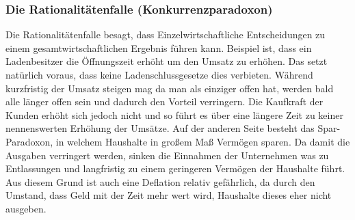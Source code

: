 \documentclass{article}
\begin{document}
	\subsubsection{Die Rationalitätenfalle (Konkurrenzparadoxon)}
	Die Rationalitätenfalle besagt, dass Einzelwirtschaftliche Entscheidungen zu einem gesamtwirtschaftlichen Ergebnis führen kann. Beispiel ist, dass ein Ladenbesitzer die Öffnungszeit erhöht um den Umsatz zu erhöhen. Das setzt natürlich voraus, dass keine Ladenschlussgesetze dies verbieten. Während kurzfristig der Umsatz steigen mag da man als einziger offen hat, werden bald alle länger offen sein und dadurch den Vorteil verringern. Die Kaufkraft der Kunden erhöht sich jedoch nicht und so führt es über eine längere Zeit zu keiner nennenswerten Erhöhung der Umsätze. 
	Auf der anderen Seite besteht das Spar-Paradoxon, in welchem Haushalte in großem Maß Vermögen sparen. Da damit die Ausgaben verringert werden, sinken die Einnahmen der Unternehmen was zu Entlassungen und langfristig zu einem geringeren Vermögen der Haushalte führt. Aus diesem Grund ist auch eine Deflation relativ gefährlich, da durch den Umstand, dass Geld mit der Zeit mehr wert wird, Haushalte dieses eher nicht ausgeben.
\end{document}
